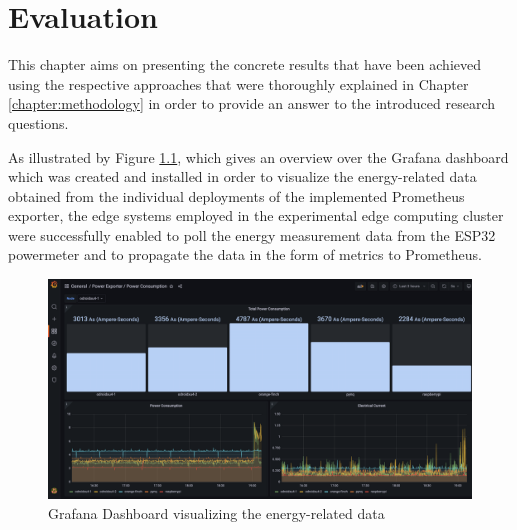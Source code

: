 \chapter{Evaluation}\label{chapter:evaluation}

This chapter aims on presenting the concrete results that have been achieved using the respective approaches that were thoroughly explained in Chapter \ref{chapter:methodology} in order to provide an answer to the introduced research questions.

As illustrated by Figure \ref{fig:grafana-dashboard}, which gives an overview over the Grafana dashboard which was created and installed in order to visualize the energy-related data obtained from the individual deployments of the implemented Prometheus exporter, the edge systems employed in the experimental edge computing cluster were successfully enabled to poll the energy measurement data from the ESP32 powermeter and to propagate the data in the form of metrics to Prometheus. 

\begin{figure}[H]
    \centering
    \includegraphics[width=\textwidth]{./figures/grafana-dashboard}
    \caption{Grafana Dashboard visualizing the energy-related data}
    \label{fig:grafana-dashboard}
\end{figure}



